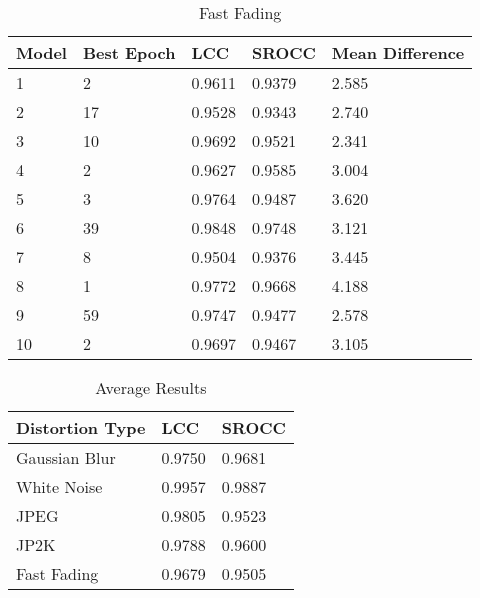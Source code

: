 \begin{table}[h]
\centering
\caption{Fast Fading}
\label{my-label}
\begin{tabular}{|l|l|l|l|l|}
\hline
Model & Best Epoch & LCC    & SROCC  & Mean Difference \\ \hline
1     & 2          & 0.9611 & 0.9379 & 2.585           \\ \hline
2     & 17         & 0.9528 & 0.9343 & 2.740           \\ \hline
3     & 10         & 0.9692 & 0.9521 & 2.341           \\ \hline
4     & 2          & 0.9627 & 0.9585 & 3.004           \\ \hline
5     & 3          & 0.9764 & 0.9487 & 3.620           \\ \hline
6     & 39         & 0.9848 & 0.9748 & 3.121           \\ \hline
7     & 8          & 0.9504 & 0.9376 & 3.445           \\ \hline
8     & 1          & 0.9772 & 0.9668 & 4.188           \\ \hline
9     & 59         & 0.9747 & 0.9477 & 2.578           \\ \hline
10    & 2          & 0.9697 & 0.9467 & 3.105           \\ \hline
\end{tabular}
\end{table}

\begin{table}[h]
\centering
\caption{Average Results}
\label{my-label}
\begin{tabular}{|l|l|l|}
\hline
Distortion Type & LCC    & SROCC  \\ \hline
Gaussian Blur   & 0.9750 & 0.9681 \\ \hline
White Noise     & 0.9957 & 0.9887 \\ \hline
JPEG            & 0.9805 & 0.9523 \\ \hline
JP2K            & 0.9788 & 0.9600 \\ \hline
Fast Fading     & 0.9679 & 0.9505 \\ \hline
\end{tabular}
\end{table}

